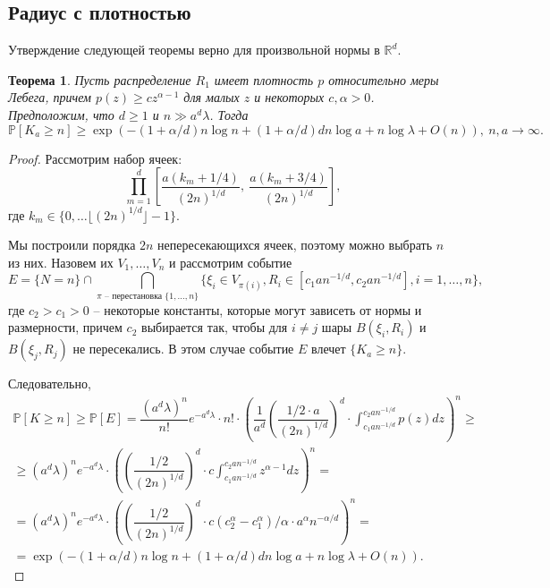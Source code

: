 \documentclass[12pt]{article}
\theoremstyle{plain}
\newtheorem{thm}{Теорема} %
\theoremstyle{definition}
\theoremstyle{remark}
\def\geq{\geqslant}
\newcommand{\R}{\mathbb{R}}
\newcommand{\PP}{\mathbb{P}}
\begin{document}
\subsection{Радиус с плотностью}
Утверждение следующей теоремы верно для произвольной нормы в $\R^d$.

\begin{thm}\label{lowdens}
Пусть распределение $R_1$ имеет плотность $p$ относительно меры Лебега, причем $p(z) \geq c z^{\alpha -1}$ для малых $z$ и некоторых $c, \alpha >0$. Предположим, что $d \geq 1$ и $n \gg a^d\lambda$.
Тогда $$\PP[K_a \geq n] \geq \exp\left(-\left(1 + \alpha/d\right)n\log n + (1 + \alpha/d)dn\log a + n\log \lambda + O(n)\right), \ n, a \to \infty.$$
\end{thm}{}





\begin{proof}
Рассмотрим набор ячеек:
\begin{equation*}
    \prod_{m = 1}^d \left[\dfrac{a(k_m + 1/4)}{(2n)^{1/d}},\ \dfrac{a(k_m + 3/4)}{(2n)^{1/d}}\right],
\end{equation*}{}
где $k_m\in \{0, \ldots \lfloor(2n)^{1/d}\rfloor - 1\}$.

Мы построили порядка $2n$ непересекающихся ячеек, поэтому можно выбрать $n$ из них. Назовем их $V_1, \ldots, V_n$  и рассмотрим событие 
\begin{equation*}
    E = \{N=n\}\cap \bigcap\limits_{\pi \text{ -- перестановка } \{1, \ldots, n\}} \{\xi_i \in V_{\pi(i)}, R_i \in [c_1an^{-1/d}, c_2an^{-1/d}],  i = 1, \ldots, n\},
\end{equation*}
где $c_2 > c_1> 0$ -- некоторые константы, которые могут зависеть от нормы и размерности, причем $c_2$ выбирается так, чтобы для $i\not=j$ шары $B(\xi_i, R_i)$ и $B(\xi_j, R_j)$ не пересекались. В этом случае событие $E$ влечет $\{K_a \geq n\}$.

Следовательно, 
\begin{multline*}
    \PP[K \geq n] \geq \PP[E] = \dfrac{(a^d\lambda)^n}{n!}e^{-a^d\lambda}\cdot n! \cdot \left(\dfrac{1}{a^d}\left(\dfrac{1/2 \cdot a}{(2n)^{1/d}}\right)^d\cdot \int_{c_1an^{-1/d}}^{c_2an^{-1/d}} p(z) dz\right)^n \geq \\
    \geq (a^d\lambda)^n e^{-a^d\lambda} \cdot \left(\left(\dfrac{1/2 }{(2n)^{1/d}}\right)^d\cdot c \int_{c_1an^{-1/d}}^{c_2an^{-1/d}} z^{\alpha - 1} dz\right)^n = \\
    = (a^d\lambda)^n e^{-a^d\lambda} \cdot \left(\left(\dfrac{1/2 }{(2n)^{1/d}}\right)^d\cdot c (c_2^\alpha - c_1^\alpha)/\alpha \cdot a^\alpha n^{-\alpha/d}\right)^n = \\
    = \exp\left(-(1 + \alpha/d)n\log n + (1 + \alpha/d)dn\log a + n\log\lambda + O(n)\right).
\end{multline*}{}
\end{proof}{}
\end{document}
